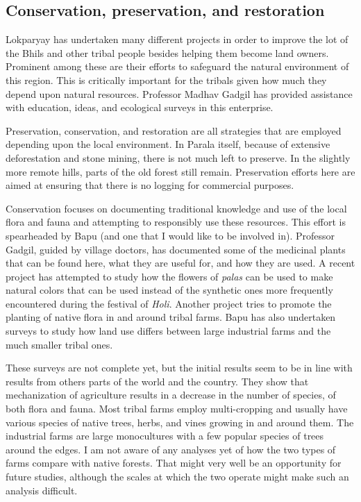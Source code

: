 \documentclass[report.tex]{subfiles}
\begin{document}
\subsection{Conservation, preservation, and restoration}

Lokparyay has undertaken many different projects in order to improve the lot of the Bhils and other tribal people besides helping them become land owners. Prominent among these are their efforts to safeguard the natural environment of this region. This is critically important for the tribals given how much they depend upon natural resources. Professor Madhav Gadgil has provided assistance with education, ideas, and ecological surveys in this enterprise.

Preservation, conservation, and restoration are all strategies that are employed depending upon the local environment. In Parala itself, because of extensive deforestation and stone mining, there is not much left to preserve. In the slightly more remote hills, parts of the old forest still remain. Preservation efforts here are aimed at ensuring that there is no logging for commercial purposes.

Conservation focuses on documenting traditional knowledge and use of the local flora and fauna and attempting to responsibly use these resources. This effort is spearheaded by Bapu (and one that I would like to be involved in). Professor Gadgil, guided by village doctors, has documented some of the medicinal plants that can be found here, what they are useful for, and how they are used. A recent project has attempted to study how the flowers of \textit{palas} can be used to make natural colors that can be used instead of the synthetic ones more frequently encountered during the festival of \textit{Holi}. Another project tries to promote the planting of native flora in and around tribal farms. Bapu has also undertaken surveys to study how land use differs between large industrial farms and the much smaller tribal ones.

These surveys are not complete yet, but the initial results seem to be in line with results from others parts of the world and the country. They show that mechanization of agriculture results in a decrease in the number of species, of both flora and fauna. Most tribal farms employ multi-cropping and usually have various species of native trees, herbs, and vines growing in and around them. The industrial farms are large monocultures with a few popular species of trees around the edges. I am not aware of any analyses yet of how the two types of farms compare with native forests. That might very well be an opportunity for future studies, although the scales at which the two operate might make such an analysis difficult.
\end{document}
